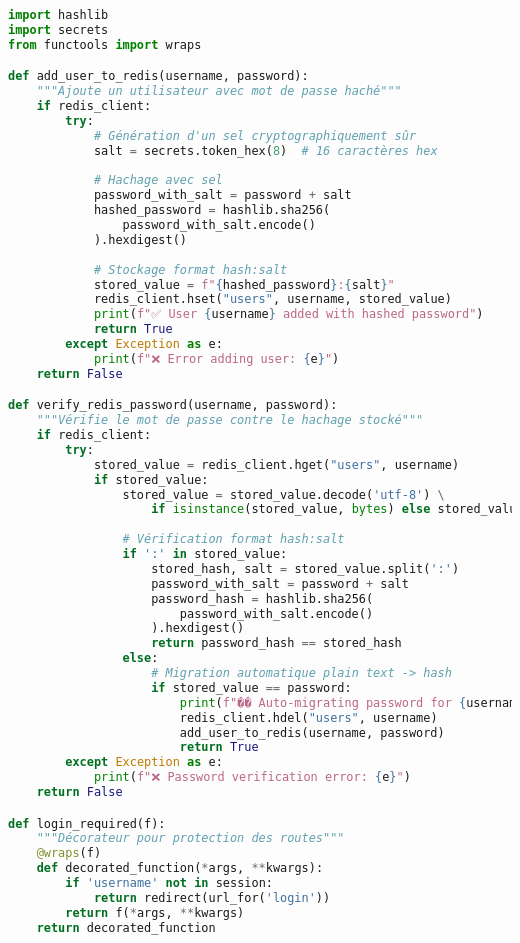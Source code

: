 \documentclass[12pt,a4paper]{article}
\begin{document}
\begin{lstlisting}[language=Python, caption=Fonctions de sécurité]
import hashlib
import secrets
from functools import wraps

def add_user_to_redis(username, password):
    """Ajoute un utilisateur avec mot de passe haché"""
    if redis_client:
        try:
            # Génération d'un sel cryptographiquement sûr
            salt = secrets.token_hex(8)  # 16 caractères hex
            
            # Hachage avec sel
            password_with_salt = password + salt
            hashed_password = hashlib.sha256(
                password_with_salt.encode()
            ).hexdigest()
            
            # Stockage format hash:salt
            stored_value = f"{hashed_password}:{salt}"
            redis_client.hset("users", username, stored_value)
            print(f"✅ User {username} added with hashed password")
            return True
        except Exception as e:
            print(f"❌ Error adding user: {e}")
    return False

def verify_redis_password(username, password):
    """Vérifie le mot de passe contre le hachage stocké"""
    if redis_client:
        try:
            stored_value = redis_client.hget("users", username)
            if stored_value:
                stored_value = stored_value.decode('utf-8') \
                    if isinstance(stored_value, bytes) else stored_value
                
                # Vérification format hash:salt
                if ':' in stored_value:
                    stored_hash, salt = stored_value.split(':')
                    password_with_salt = password + salt
                    password_hash = hashlib.sha256(
                        password_with_salt.encode()
                    ).hexdigest()
                    return password_hash == stored_hash
                else:
                    # Migration automatique plain text -> hash
                    if stored_value == password:
                        print(f"�� Auto-migrating password for {username}")
                        redis_client.hdel("users", username)
                        add_user_to_redis(username, password)
                        return True
        except Exception as e:
            print(f"❌ Password verification error: {e}")
    return False

def login_required(f):
    """Décorateur pour protection des routes"""
    @wraps(f)
    def decorated_function(*args, **kwargs):
        if 'username' not in session:
            return redirect(url_for('login'))
        return f(*args, **kwargs)
    return decorated_function


\end{lstlisting}
\end{document}
